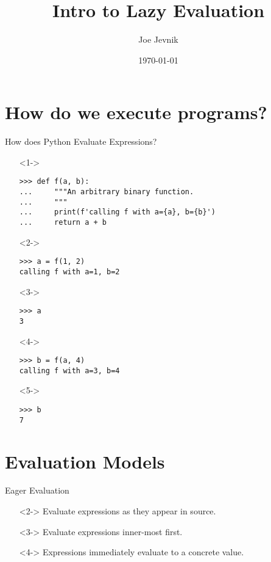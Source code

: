 \documentclass{beamer}
\title{Intro to Lazy Evaluation}
\date{\today}
\author{Joe Jevnik}
\institute{PyCon 2017}
\begin{document}
\maketitle

\section{How do we execute programs?}

\begin{frame}[fragile]{How does Python Evaluate Expressions?}
  \begin{itemize}
  \item[]<1-> \begin{verbatim}
>>> def f(a, b):
...     """An arbitrary binary function.
...     """
...     print(f'calling f with a={a}, b={b}')
...     return a + b
    \end{verbatim}
  \item[]<2-> \begin{verbatim}
>>> a = f(1, 2)
calling f with a=1, b=2
    \end{verbatim}
  \item[]<3-> \begin{verbatim}
>>> a
3
    \end{verbatim}
  \item[]<4-> \begin{verbatim}
>>> b = f(a, 4)
calling f with a=3, b=4
    \end{verbatim}
  \item[]<5-> \begin{verbatim}
>>> b
7
    \end{verbatim}
  \end{itemize}
\end{frame}

\section{Evaluation Models}

\begin{frame}{Eager Evaluation}
  \begin{definition}
    \begin{itemize}
    \item[]<2-> Evaluate expressions as they appear in source.
    \item[]<3-> Evaluate expressions inner-most first.
    \item[]<4-> Expressions immediately evaluate to a concrete value.
    \end{itemize}
  \end{definition}
\end{frame}
\end{document}
